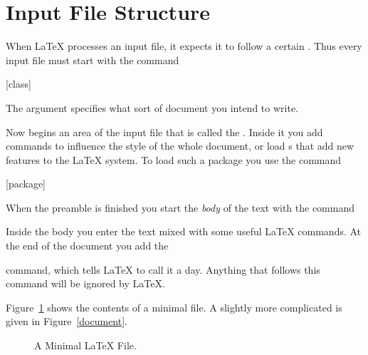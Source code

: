 \section{Input File Structure}\label{sec:structure}
When \LaTeX{} processes an input file, it expects it to follow a
certain . Thus every input file must start with the
command
\begin{code}
  [class]
\end{code}
The  argument specifies what sort of document you intend to write.

Now begins an area of the input file that is called the \emph{}.
Inside it you add commands to influence the style of the whole document, or
load s that add new features to the \LaTeX{} system. To load such a
package you use the command
\begin{code}
  [package]
\end{code}

When the preamble is finished you start the \emph{body} of the text with the
command
\begin{code}
\verb||
\end{code}

Inside the body you enter the text mixed with some useful \LaTeX{} commands.
At the end of the document you add the
\begin{code}
\verb||
\end{code}
command, which tells \LaTeX{} to call it a day. Anything that
follows this command will be ignored by \LaTeX.

Figure~\ref{mini} shows the contents of a minimal \LaTeXe{} file. A
slightly more complicated  is given in
Figure~\ref{document}.

\begin{figure}[htp]
  \begin{lined}{10cm}
  \end{lined}
  \caption{A Minimal \LaTeX{} File.}\label{mini}
\end{figure}

